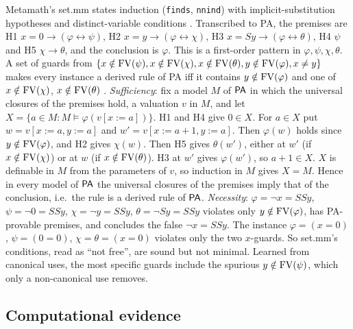 Metamath's set.mm states induction (\texttt{finds}, \texttt{nnind}) with implicit-substitution hypotheses and
distinct-variable conditions \citep{megill2019metamath}. Transcribed to PA, the premises are H1
$x=0\to(\varphi\leftrightarrow\psi)$, H2 $x=y\to(\varphi\leftrightarrow\chi)$, H3 $x=Sy\to(\varphi\leftrightarrow\theta)$,
H4 $\psi$ and H5 $\chi\to\theta$, and the conclusion is $\varphi$. This is a first-order pattern in
$\varphi,\psi,\chi,\theta$. A set of guards from $\{x\notin\mathrm{FV}(\psi),x\notin\mathrm{FV}(\chi),x\notin\mathrm{FV}(\theta),y\notin
\mathrm{FV}(\varphi),x\ne y\}$ makes every instance a derived rule of PA iff it contains $y\notin\mathrm{FV}(\varphi)$ and one of
$x\notin\mathrm{FV}(\chi)$, $x\notin\mathrm{FV}(\theta)$ .
\emph{Sufficiency}: fix a model $M$ of $\mathsf{PA}$ in which the universal closures of the premises hold, a valuation $v$ in
$M$, and let $X=\{a\in M:M\models\varphi(v[x{:=}a])\}$. H1 and H4 give $0\in X$. For $a\in X$ put $w=v[x{:=}a,y{:=}a]$
and $w'=v[x{:=}a{+}1,y{:=}a]$. Then $\varphi(w)$ holds since $y\notin\mathrm{FV}(\varphi)$, and H2 gives $\chi(w)$. Then H5 gives
$\theta(w')$, either at $w'$ (if $x\notin\mathrm{FV}(\chi)$) or at $w$ (if $x\notin\mathrm{FV}(\theta)$). H3 at $w'$ gives
$\varphi(w')$, so $a+1\in X$. $X$ is definable in $M$ from the parameters of $v$, so induction in $M$ gives $X=M$.
Hence in every model of $\mathsf{PA}$ the universal closures of the premises imply that of the conclusion, i.e.\ the rule is a
derived rule of $\mathsf{PA}$.
\emph{Necessity}: $\varphi=\neg x=SSy$, $\psi=\neg0=SSy$, $\chi=\neg y=SSy$, $\theta=\neg Sy=SSy$ violates only
$y\notin\mathrm{FV}(\varphi)$, has PA-provable premises, and concludes the false $\neg x=SSy$. The instance $\varphi=(x=0)$,
$\psi=(0=0)$, $\chi=\theta=(x=0)$ violates only the two $x$-guards. So set.mm's conditions, read as ``not free'', are sound
but not minimal. Learned from canonical uses, the most specific guards include the spurious $y\notin\mathrm{FV}(\psi)$, which only
a non-canonical use removes.

\subsection{Computational evidence}\label{app:zf:evidence}

